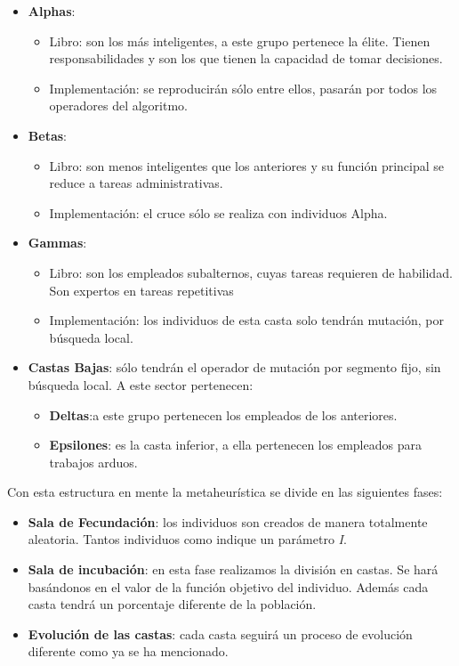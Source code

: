 \begin{itemize}
    \item \textbf{Alphas}:
        \begin{itemize}
            \item Libro: son los más inteligentes, a este grupo pertenece la élite. Tienen responsabilidades y son
            los que tienen la capacidad de tomar decisiones.
            \item Implementación: se reproducirán sólo entre ellos, pasarán por todos los operadores del algoritmo.
        \end{itemize}
    \item \textbf{Betas}: 
        \begin{itemize}
            \item Libro: son menos inteligentes que los anteriores y su función principal se reduce a tareas
            administrativas.
            \item  Implementación: el cruce sólo se realiza con individuos Alpha.
        \end{itemize}
    \item \textbf{Gammas}: 
        \begin{itemize}
            \item Libro: son los empleados subalternos, cuyas tareas requieren de habilidad. Son expertos en tareas repetitivas
            \item Implementación: los individuos de esta casta solo tendrán mutación, por búsqueda local.
        \end{itemize}
    \item \textbf{Castas Bajas}: sólo tendrán el operador de mutación por segmento fijo, sin búsqueda local. A este sector pertenecen:
        \begin{itemize}
            \item \textbf{Deltas}:a este grupo pertenecen los empleados de los anteriores.
            \item \textbf{Epsilones}: es la casta inferior, a ella pertenecen los empleados para trabajos arduos.
        \end{itemize}
\end{itemize}

Con esta estructura en mente la metaheurística se divide en las siguientes fases:

\begin{itemize}
    \item \textbf{Sala de Fecundación}: los individuos son creados de manera totalmente aleatoria. Tantos individuos
    como indique un parámetro \textit{I}.
    \item \textbf{Sala de incubación}: en esta fase realizamos la división en castas. Se hará basándonos en el valor de
    la función objetivo del individuo. Además cada casta tendrá un porcentaje diferente de la población.
    \item \textbf{Evolución de las castas}: cada casta seguirá un proceso de evolución diferente como ya se 
    ha mencionado.
\end{itemize}


